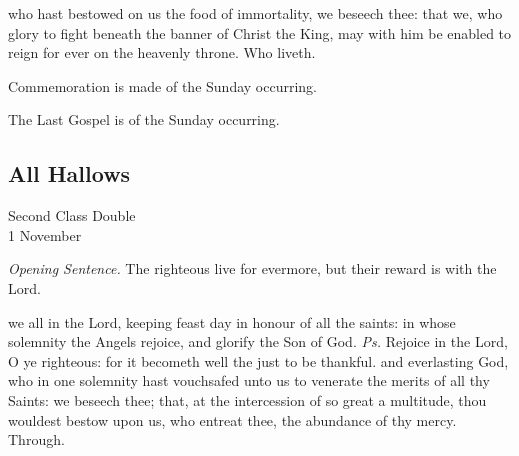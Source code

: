 \clearpage
\postcommunion
{} who hast bestowed on us the food of immortality, we beseech thee: that we, who glory to fight beneath the banner of Christ the King, may with him be enabled to reign for ever on the heavenly throne. Who liveth.
\begin{rubric}
    Commemoration is made of the Sunday occurring.
\end{rubric}
\begin{rubric}
    The Last Gospel is of the Sunday occurring.
\end{rubric}

\subsection{All Hallows}
\begin{inhead}
    {Second Class Double\\
1 November}
\end{inhead}
\par\noindent
\textit{Opening Sentence.} The righteous live for evermore, but their reward is with the Lord.

\introit
{} we all in the Lord, keeping feast day in honour of all the saints: in whose solemnity the Angels rejoice, and glorify the Son of God. \textit{Ps.} Rejoice in the Lord, O ye righteous: for it becometh well the just to be thankful.
\collect
 and everlasting God, who in one solemnity hast vouchsafed unto us to venerate the merits of all thy Saints: we beseech thee; that, at the intercession of so great a multitude, thou wouldest bestow upon us, who entreat thee, the abundance of thy mercy. Through.

